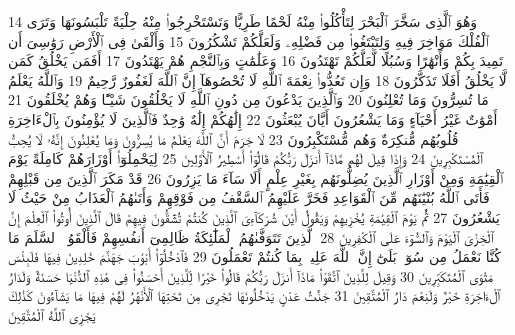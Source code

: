 {\tiny\colorbox{cl_aya}{14}} وَهُوَ ٱلَّذِى سَخَّرَ ٱلْبَحْرَ لِتَأْكُلُوا۟ مِنْهُ لَحْمًا طَرِيًّا وَتَسْتَخْرِجُوا۟ مِنْهُ حِلْيَةً تَلْبَسُونَهَا وَتَرَى ٱلْفُلْكَ مَوَاخِرَ فِيهِ وَلِتَبْتَغُوا۟ مِن فَضْلِهِۦ وَلَعَلَّكُمْ تَشْكُرُونَ
{\tiny\colorbox{cl_aya}{15}} وَأَلْقَىٰ فِى ٱلْأَرْضِ رَوَٰسِىَ أَن تَمِيدَ بِكُمْ وَأَنْهَٰرًا وَسُبُلًا لَّعَلَّكُمْ تَهْتَدُونَ
{\tiny\colorbox{cl_aya}{16}} وَعَلَٰمَٰتٍ وَبِٱلنَّجْمِ هُمْ يَهْتَدُونَ
{\tiny\colorbox{cl_aya}{17}} أَفَمَن يَخْلُقُ كَمَن لَّا يَخْلُقُ أَفَلَا تَذَكَّرُونَ
{\tiny\colorbox{cl_aya}{18}} وَإِن تَعُدُّوا۟ نِعْمَةَ ٱللَّهِ لَا تُحْصُوهَآ إِنَّ ٱللَّهَ لَغَفُورٌ رَّحِيمٌ
{\tiny\colorbox{cl_aya}{19}} وَٱللَّهُ يَعْلَمُ مَا تُسِرُّونَ وَمَا تُعْلِنُونَ
{\tiny\colorbox{cl_aya}{20}} وَٱلَّذِينَ يَدْعُونَ مِن دُونِ ٱللَّهِ لَا يَخْلُقُونَ شَيْـًٔا وَهُمْ يُخْلَقُونَ
{\tiny\colorbox{cl_aya}{21}} أَمْوَٰتٌ غَيْرُ أَحْيَآءٍ وَمَا يَشْعُرُونَ أَيَّانَ يُبْعَثُونَ
{\tiny\colorbox{cl_aya}{22}} إِلَٰهُكُمْ إِلَٰهٌ وَٰحِدٌ فَٱلَّذِينَ لَا يُؤْمِنُونَ بِٱلْءَاخِرَةِ قُلُوبُهُم مُّنكِرَةٌ وَهُم مُّسْتَكْبِرُونَ
{\tiny\colorbox{cl_aya}{23}} لَا جَرَمَ أَنَّ ٱللَّهَ يَعْلَمُ مَا يُسِرُّونَ وَمَا يُعْلِنُونَ إِنَّهُۥ لَا يُحِبُّ ٱلْمُسْتَكْبِرِينَ
{\tiny\colorbox{cl_aya}{24}} وَإِذَا قِيلَ لَهُم مَّاذَآ أَنزَلَ رَبُّكُمْ قَالُوٓا۟ أَسَٰطِيرُ ٱلْأَوَّلِينَ
{\tiny\colorbox{cl_aya}{25}} لِيَحْمِلُوٓا۟ أَوْزَارَهُمْ كَامِلَةً يَوْمَ ٱلْقِيَٰمَةِ وَمِنْ أَوْزَارِ ٱلَّذِينَ يُضِلُّونَهُم بِغَيْرِ عِلْمٍ أَلَا سَآءَ مَا يَزِرُونَ
{\tiny\colorbox{cl_aya}{26}} قَدْ مَكَرَ ٱلَّذِينَ مِن قَبْلِهِمْ فَأَتَى ٱللَّهُ بُنْيَٰنَهُم مِّنَ ٱلْقَوَاعِدِ فَخَرَّ عَلَيْهِمُ ٱلسَّقْفُ مِن فَوْقِهِمْ وَأَتَىٰهُمُ ٱلْعَذَابُ مِنْ حَيْثُ لَا يَشْعُرُونَ
{\tiny\colorbox{cl_aya}{27}} ثُمَّ يَوْمَ ٱلْقِيَٰمَةِ يُخْزِيهِمْ وَيَقُولُ أَيْنَ شُرَكَآءِىَ ٱلَّذِينَ كُنتُمْ تُشَٰٓقُّونَ فِيهِمْ قَالَ ٱلَّذِينَ أُوتُوا۟ ٱلْعِلْمَ إِنَّ ٱلْخِزْىَ ٱلْيَوْمَ وَٱلسُّوٓءَ عَلَى ٱلْكَٰفِرِينَ
{\tiny\colorbox{cl_aya}{28}} ٱلَّذِينَ تَتَوَفَّىٰهُمُ ٱلْمَلَٰٓئِكَةُ ظَالِمِىٓ أَنفُسِهِمْ فَأَلْقَوُا۟ ٱلسَّلَمَ مَا كُنَّا نَعْمَلُ مِن سُوٓءٍۭ بَلَىٰٓ إِنَّ ٱللَّهَ عَلِيمٌۢ بِمَا كُنتُمْ تَعْمَلُونَ
{\tiny\colorbox{cl_aya}{29}} فَٱدْخُلُوٓا۟ أَبْوَٰبَ جَهَنَّمَ خَٰلِدِينَ فِيهَا فَلَبِئْسَ مَثْوَى ٱلْمُتَكَبِّرِينَ
{\tiny\colorbox{cl_aya}{30}} وَقِيلَ لِلَّذِينَ ٱتَّقَوْا۟ مَاذَآ أَنزَلَ رَبُّكُمْ قَالُوا۟ خَيْرًا لِّلَّذِينَ أَحْسَنُوا۟ فِى هَٰذِهِ ٱلدُّنْيَا حَسَنَةٌ وَلَدَارُ ٱلْءَاخِرَةِ خَيْرٌ وَلَنِعْمَ دَارُ ٱلْمُتَّقِينَ
{\tiny\colorbox{cl_aya}{31}} جَنَّٰتُ عَدْنٍ يَدْخُلُونَهَا تَجْرِى مِن تَحْتِهَا ٱلْأَنْهَٰرُ لَهُمْ فِيهَا مَا يَشَآءُونَ كَذَٰلِكَ يَجْزِى ٱللَّهُ ٱلْمُتَّقِينَ
